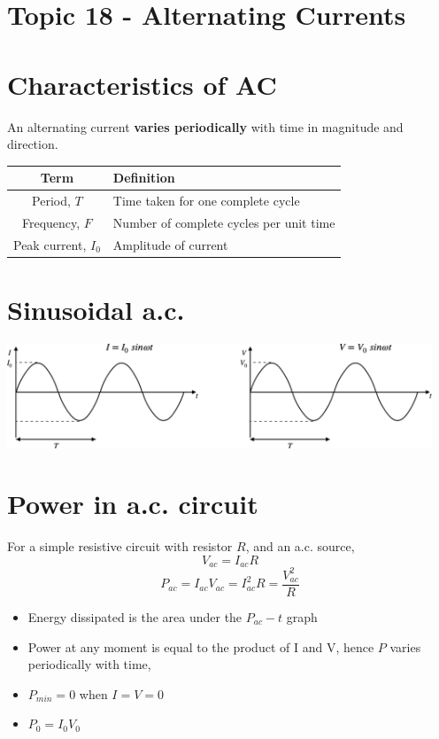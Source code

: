 \documentclass[a4paper, 10pt]{article}
\begin{document}
\section*{Topic 18 - Alternating Currents}
\section{Characteristics of AC}

An alternating current \textbf{varies periodically} with time in magnitude and direction.

\begin{center}
   \begin{tabular}{c | T}
      Term & Definition \\
      \hline
      Period, $T$ & Time taken for one complete cycle \\ 
      \hline
      Frequency, $F$  & Number of complete cycles per unit time \\
      \hline
      Peak current, $I_0$ & Amplitude of current \\
      \hline
   \end{tabular}
\end{center}

\section{Sinusoidal a.c.}
\begin{center}
  \includegraphics[width=5in]{figures/1.pdf}  
\end{center}	

\section{Power in a.c. circuit}
For a simple resistive circuit with resistor $R$, and an a.c. source,
\[
   V_{ac} = I_{ac} R
\]
\[
   P_{ac} = I_{ac} V_{ac} = I_{ac}^2 R = \frac{V_{ac}^2}{R}
\]
\begin{itemize}
   \item Energy dissipated is the area under the $P_{ac} - t$ graph
   \item Power at any moment is equal to the product of I and V, hence $P$ varies periodically with time,
   \item $P_{min} = 0$ when $I = V =  0$ 
   \item $P_0 = I_0 V_0$ 
\end{itemize}	
\end{document}
